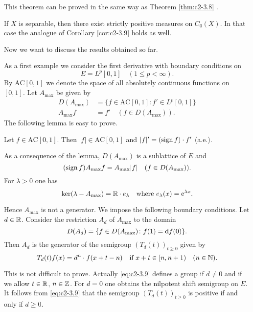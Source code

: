 This theorem can be proved in the same way as Theorem \ref{thm:c2-3.8}  .
\begin{remark*}
If $X$ is separable, then there exist strictly positive
measures on $C_{0}(X)$. 
In that case the analogue of Corollary \ref{cor:c2-3.9}   holds
as well.
\end{remark*}
Now we want to discuss the results obtained so far.

As a first example we consider the first derivative with boundary
conditions on %
\[
	E = L^{p}[0,1] \quad (1 \leq p < \infty) .
\]
%
By $\text{AC}[0,1]$ we denote the space of all absolutely continuous functions on $[0,1]$. 
Let $A_{\max}$ be given by
\begin{align*}
D(A_{\max}) &= \{f \in \text{AC}[0,1] \colon f' \in L^{p}[0,1]\}\\
A_{\max}f &= f' \quad (f \in D(A_{\max})).
\end{align*}
The following lemma is easy to prove.
\begin{lemma}\label{lem:c2-3.14}
Let $f \in \text{AC}[0,1]$. 
Then $|f| \in \text{AC}[0,1]$ and $|f|' = (\operatorname{sign}  f) \cdot f'$ (a.e.).
\end{lemma}
As a consequence of the lemma, $D(A_{\max})$ is a sublattice of $E$ and
\begin{equation}\label{eq:c2-3.7}
(\operatorname{sign}  f)A_{\max}f = A_{\max}|f| \quad (f \in D(A_{\max})).
\end{equation}
For $\lambda > 0$ one has
\begin{equation}\label{eq:c2-3.8}
\text{ker}(\lambda - A_{\max}) = \mathbb{R} \cdot e_{\lambda} \quad \text{where }  e_{\lambda}(x) = \mathrm{e}^{\lambda x}.
\end{equation}

Hence $A_{\max}$ is not a generator. 
We impose the following boundary conditions.
Let $d \in \mathbb{R}$. 
Consider the restriction $A_{d}$ of $A_{\max}$ to the domain
\begin{equation*}
D(A_{d}) = \{f \in D(A_{\max}) \colon f(1) = \mathop{}\!\mathrm{d}{}f(0)\}.
\end{equation*}
Then $A_{d}$ is the generator of the semigroup $(T_{d}(t))_{t \geq 0}$ given by
\begin{equation}\label{eq:c2-3.9}
T_{d}(t)f(x) = d^{n} \cdot f(x+t-n) \quad \text{if } x+t \in [n, n+1) \quad (n \in \mathbb{N} ).
\end{equation}

This is not difficult to prove. 
Actually \eqref{eq:c2-3.9} defines a group if $d \neq 0$ and if we allow $t \in \mathbb{R}$, $n \in \mathbb{Z} $. For $d = 0$ one obtains the nilpotent shift semigroup on $E$.
It follows from \eqref{eq:c2-3.9} that the semigroup $(T_{d}(t))_{t \geq 0}$ is positive if and only if $d \geq 0$.


